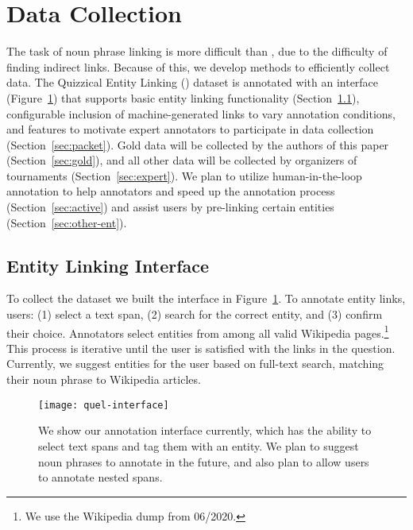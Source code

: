 \section{Data Collection}
\label{sec:int}

The task of noun phrase linking is more difficult than \nel{}, due to the difficulty of finding indirect links.  Because of this, we develop methods to efficiently collect data.
The Quizzical Entity Linking (\quel{}) dataset is annotated with an interface (Figure~\ref{fig:nel-int}) that supports basic entity linking functionality (Section~\ref{sec:el-int}), configurable inclusion of machine-generated links to vary annotation conditions, and features to motivate expert annotators to participate in data collection (Section~\ref{sec:packet}).
Gold data will be collected by the authors of this paper (Section~\ref{sec:gold}), and all other data will be collected by organizers of \qb{} tournaments (Section~\ref{sec:expert}).
We plan to utilize human-in-the-loop annotation to help annotators and speed up the annotation process (Section~\ref{sec:active}) and assist users by pre-linking certain entities (Section~\ref{sec:other-ent}). 

\subsection{Entity Linking Interface}
\label{sec:el-int}

To collect the \quel{} dataset we built the interface in Figure~\ref{fig:nel-int}.
To annotate entity links, users: (1) select a text span, (2) search for the correct entity, and (3) confirm their choice.
Annotators select entities from among all valid Wikipedia pages.\footnote{
    We use the Wikipedia dump from 06/2020.
}
This process is iterative until the user is satisfied with the links in the question.
Currently, we suggest entities for the user based on full-text search, matching their noun phrase to Wikipedia articles. 


\begin{figure}[t]
    \centering
    \texttt{[image: quel-interface]}
    \caption{
        We show our annotation interface currently, which has the ability to select text spans and tag them with an entity. 
        We plan to suggest noun phrases to annotate in the future, and also plan to allow users to annotate nested spans. 
    }
    \label{fig:nel-int}
\end{figure}


